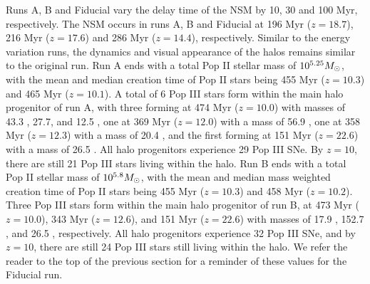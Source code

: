 \documentclass[fleqn,usenatbib]{mnras}
\begin{document}
Runs A, B and Fiducial vary the delay time of the NSM by 10, 30 and 100 Myr, respectively. The NSM occurs in runs A, B and Fiducial at 196 Myr ($z = 18.7$), 216 Myr ($z = 17.6$) and 286 Myr ($z = 14.4$), respectively. Similar to the energy variation runs, the dynamics and visual appearance of the halos remains similar to the original run. Run A ends with a total Pop II stellar mass of $10^{5.25} \Ms$, with the mean and median creation time of Pop II stars being 455 Myr ($z = 10.3$) and 465 Myr ($z = 10.1$). A total of 6 Pop III stars form within the main halo progenitor of run A, with three forming at 474 Myr ($z = 10.0$) with masses of 43.3 \Ms{}, 27.7\Ms{}, and 12.5 \Ms{}, one at 369 Myr ($z = 12.0$) with a mass of 56.9 \Ms, one at 358 Myr ($z = 12.3$) with a mass of 20.4 \Ms{}, and the first forming at 151 Myr ($z = 22.6$) with a mass of 26.5 \Ms. All halo progenitors experience 29 Pop III SNe. By $z = 10$, there are still 21 Pop III stars living within the halo. Run B ends with a total Pop II stellar mass of $10^{5.8} \Ms$, with the mean and median mass weighted creation time of Pop II stars being 455 Myr ($z = 10.3$) and 458 Myr ($z = 10.2$). Three Pop III stars form within the main halo progenitor of run B, at 473 Myr ($z = 10.0$), 343 Myr ($z = 12.6$), and 151 Myr ($z = 22.6$) with masses of 17.9 \Ms{}, 152.7 \Ms{}, and 26.5 \Ms{}, respectively. All halo progenitors experience 32 Pop III SNe, and by $z = 10$, there are still 24 Pop III stars still living within the halo. We refer the reader to the top of the previous section for a reminder of these values for the Fiducial run. 
\end{document}

